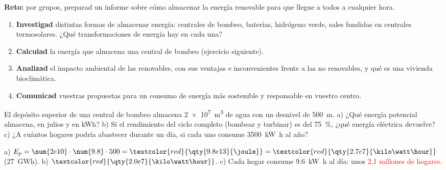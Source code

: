 \begin{marker}
    \textbf{Reto:} por grupos, preparad un informe sobre cómo almacenar la energía renovable para que llegue a todos a cualquier hora.
\end{marker}

\begin{enumerate}[label=\numberballred]
    \item \textbf{Investigad} distintas formas de almacenar energía: centrales de bombeo, baterías, hidrógeno verde, sales fundidas en
    centrales termosolares. ¿Qué transformaciones de energía hay en cada una?
    \item \textbf{Calculad} la energía que almacena una central de bombeo (ejercicio siguiente).
    \item \textbf{Analizad} el impacto ambiental de las renovables, con sus ventajas e inconvenientes frente a las no renovables, y qué
    es una vivienda bioclimática.
    \item \textbf{Comunicad} vuestras propuestas para un consumo de energía más sostenible y responsable en vuestro centro.
\end{enumerate}

\begin{exercise}
    El depósito superior de una central de bombeo almacena \qty{2e7}{\m\cubed} de agua con un desnivel de \qty{500}{\m}. a) ¿Qué
    energía potencial almacena, en julios y en kWh? b) Si el rendimiento del ciclo completo (bombear y turbinar) es del \qty{75}{\percent},
    ¿qué energía eléctrica devuelve? c) ¿A cuántos hogares podría abastecer durante un día, si cada uno consume \qty{3500}{\kilo\watt\hour}
    al año?
    \begin{solu}
        a) \(E_p = \num{2e10} \cdot \num{9.8} \cdot 500 = \textcolor{red}{\qty{9.8e13}{\joule}} = \textcolor{red}{\qty{2.7e7}{\kilo\watt\hour}}\)
        (27~GWh). b) \(\textcolor{red}{\qty{2.0e7}{\kilo\watt\hour}}\). c) Cada hogar consume \qty{9.6}{\kilo\watt\hour} al día:
        unos \textcolor{red}{2,1 millones de hogares}.
    \end{solu}
\end{exercise}

